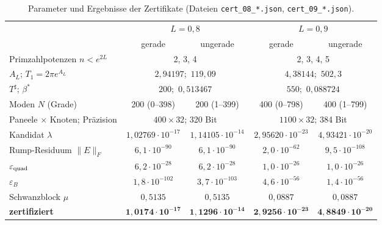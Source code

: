 \documentclass[11pt,a4paper]{article}
\theoremstyle{definition}
\newcommand{\eps}{\varepsilon}
\begin{document}
\begin{table}[h]
\centering\small
\begin{tabular}{@{}lcccc@{}}
\toprule
 & \multicolumn{2}{c}{$L=0{,}8$} & \multicolumn{2}{c}{$L=0{,}9$}\\
 & gerade & ungerade & gerade & ungerade\\
\midrule
Primzahlpotenzen $n<e^{2L}$ & \multicolumn{2}{c}{2, 3, 4} & \multicolumn{2}{c}{2, 3, 4, 5}\\
$A_L$; $T_1=2\pi e^{A_L}$ & \multicolumn{2}{c}{$2{,}94197$;\ $119{,}09$} & \multicolumn{2}{c}{$4{,}38144$;\ $502{,}3$}\\
$T^\sharp$; $\beta^*$ & \multicolumn{2}{c}{$200$;\ $0{,}513467$} & \multicolumn{2}{c}{$550$;\ $0{,}088724$}\\
Moden $N$ (Grade) & 200 (0--398) & 200 (1--399) & 400 (0--798) & 400 (1--799)\\
Paneele $\times$ Knoten; Präzision & \multicolumn{2}{c}{$400\times32$; 320 Bit} & \multicolumn{2}{c}{$1100\times32$; 384 Bit}\\
\midrule
Kandidat $\lambda$ & $1{,}02769\cdot10^{-17}$ & $1{,}14105\cdot10^{-14}$ & $2{,}95620\cdot10^{-23}$ & $4{,}93421\cdot10^{-20}$\\
Rump-Residuum $\|E\|_F$ & $6{,}1\cdot10^{-90}$ & $6{,}1\cdot10^{-90}$ & $2{,}0\cdot10^{-62}$ & $9{,}5\cdot10^{-108}$\\
$\eps_{\rm quad}$ & $6{,}2\cdot10^{-28}$ & $6{,}2\cdot10^{-28}$ & $1{,}0\cdot10^{-26}$ & $1{,}0\cdot10^{-26}$\\
$\eps_B$ & $1{,}8\cdot10^{-102}$ & $3{,}7\cdot10^{-103}$ & $4{,}6\cdot10^{-56}$ & $1{,}4\cdot10^{-56}$\\
Schwanzblock $\mu$ & $0{,}5135$ & $0{,}5135$ & $0{,}0887$ & $0{,}0887$\\
\textbf{zertifiziert} & $\mathbf{1{,}0174\cdot10^{-17}}$ & $\mathbf{1{,}1296\cdot10^{-14}}$ & $\mathbf{2{,}9256\cdot10^{-23}}$ & $\mathbf{4{,}8849\cdot10^{-20}}$\\
\bottomrule
\end{tabular}
\caption{Parameter und Ergebnisse der Zertifikate (Dateien \texttt{cert\_08\_*.json}, \texttt{cert\_09\_*.json}).}
\label{tab:cert}
\end{table}
\end{document}

